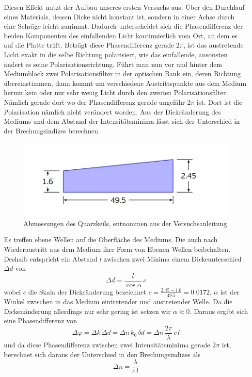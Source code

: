\documentclass[a4paper, 12pt,]{scrartcl}
\begin{document}
Diesen Effekt nutzt der Aufbau unseres ersten Versuchs aus. Über den Durchlauf eines Materials, dessen Dicke nicht konstant ist, sondern in einer Achse durch eine Schräge leicht zunimmt. Dadurch unterscheidet sich die Phasendifferenz der beiden Komponenten des einfallenden Licht kontinuierlich vom Ort, an dem es auf die Platte trifft. Beträgt diese Phasendifferenz gerade $2\pi$, ist das austretende Licht exakt in die selbe Richtung polarisiert, wie das einfallende, ansonsten ändert es seine Polarisationsrichtung. Führt man nun vor und hinter dem Mediumblock zwei Polarisationsfilter in der optischen Bank ein, deren Richtung übereinstimmen, dann kommt um verschiedene Austrittspunkte aus dem Medium herum kein oder nur sehr wenig Licht durch den zweiten Polarisationsfilter. Nämlich gerade dort wo der Phasendifferenz gerade ungefähr $2\pi$ ist. Dort ist die Polarisation nämlich nicht verändert worden.\newline
Aus der Dickeänderung des Mediums und dem Abstand der Intensitätsminima lässt sich der Unterschied in der Brechungsindizes berechnen.
\begin{figure}[H]\centering\includegraphics[scale=0.7]{Keil}\caption{Abmessungen des Quarzkeils, entnommen aus der Versuchsanleitung}\end{figure}
Es treffen ebene Wellen auf die Oberfläche des Mediums. Die auch nach Wiederaustritt aus dem Medium ihre Form von Ebenen Wellen beibehalten. Deshalb entspricht ein Abstand $l$ zwischen zwei Minima einem Dickeunterschied $\Delta{d}$ von
\begin{equation*}\Delta{d}=\frac{l}{\cos\alpha}\,c\end{equation*}
wobei $c$ die Skala der Dickeänderung bezeichnet $c=\frac{2.45-1.6}{49.5}=0.0172$. $\alpha$ ist der Winkel zwischen in das Medium eintretender und austretender Welle. Da die Dickenänderung allerdings nur sehr gering ist setzen wir $\alpha\approx0$. Daraus ergibt sich eine Phasendifferenz von
\begin{equation*}\Delta\varphi=\Delta{k}\,\Delta{d}=\Delta{n}\,k_0\,\delta{d}=\Delta{n}\,\frac{2\pi}{\lambda}\,c\,l\end{equation*}
und da diese Phasendifferenz zwischen zwei Intensitätsminima gerade $2\pi$ ist, berechnet sich daraus der Unterschied in den Brechungsindizes als
\begin{equation*}\Delta{n}=\frac{\lambda}{c\,l}\end{equation*}
\end{document}
